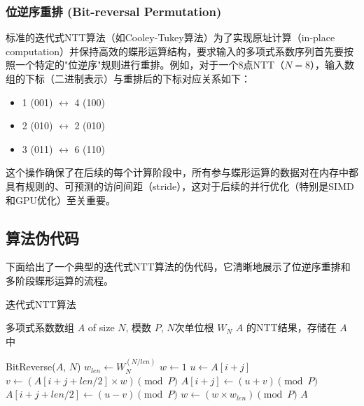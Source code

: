 \documentclass[a4paper]{article}
\begin{document}
\subsubsection{位逆序重排 (Bit-reversal Permutation)}
标准的迭代式NTT算法（如Cooley-Tukey算法）为了实现原址计算（in-place computation）并保持高效的蝶形运算结构，要求输入的多项式系数序列首先要按照一个特定的"位逆序"规则进行重排。例如，对于一个8点NTT（$N=8$），输入数组的下标（二进制表示）与重排后的下标对应关系如下：
\begin{itemize}
    \item 1 (001) $\leftrightarrow$ 4 (100)
    \item 2 (010) $\leftrightarrow$ 2 (010)
    \item 3 (011) $\leftrightarrow$ 6 (110)
\end{itemize}
这个操作确保了在后续的每个计算阶段中，所有参与蝶形运算的数据对在内存中都具有规则的、可预测的访问间距（stride），这对于后续的并行优化（特别是SIMD和GPU优化）至关重要。

\subsection{算法伪代码}
下面给出了一个典型的迭代式NTT算法的伪代码，它清晰地展示了位逆序重排和多阶段蝶形运算的流程。

\begin{algorithm}[H]
\caption{迭代式NTT算法}
\label{alg:ntt}
\begin{algorithmic}[1]
\Require 多项式系数数组 $A$ of size $N$, 模数 $P$, $N$次单位根 $W_N$
\Ensure $A$ 的NTT结果，存储在 $A$ 中

\State BitReverse($A$, $N$) 
 
    \State $w_{len} \leftarrow W_N^{(N/len)}$ 
     
        \State $w \leftarrow 1$
         
            \State $u \leftarrow A[i+j]$
            \State $v \leftarrow (A[i+j+len/2] \times w) \pmod{P}$
            \State $A[i+j] \leftarrow (u+v) \pmod{P}$
            \State $A[i+j+len/2] \leftarrow (u-v) \pmod{P}$
            \State $w \leftarrow (w \times w_{len}) \pmod{P}$
        \EndFor
    \EndFor
\EndFor
\State \Return $A$
\end{algorithmic}
\end{algorithm}
\end{document}
